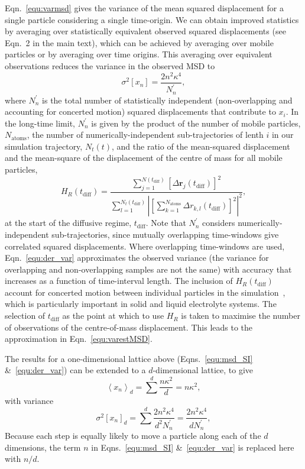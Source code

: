 \documentclass[reprint,superscriptaddress,nobibnotes,amsmath,amssymb,aps,prx,hidelinks,linenumbers]{revtex4-2}
\newcommand{\oMSDi}{\ensuremath{x_i}}
\newcommand{\oMSDn}{\ensuremath{x_n}}
\newcommand{\moMSDn}{\ensuremath{\left<\oMSDn\right>}}
\newcommand{\nind}[1]{\ensuremath{N^\prime_{#1}}}
\newcommand{\var}[1]{\ensuremath{\sigma^2[#1]}}
\begin{document}
Eqn.~\ref{equ:varmsd} gives the variance of the mean squared displacement for a single particle considering a single time-origin.
We can obtain improved statistics by averaging over statistically equivalent observed squared displacements (see Eqn.~2 in the main text), which can be achieved by averaging over mobile particles or by averaging over time origins.
This averaging over equivalent observations reduces the variance in the observed MSD to
\begin{equation}
    \var{\oMSDn} = \frac{2n^2\kappa^4}{\nind{n}},
\label{equ:der_var}
\end{equation}
where $\nind{n}$ is the total number of statistically independent (non-overlapping and accounting for concerted motion) squared displacements that contribute to $\oMSDi$.
In the long-time limit, $\nind{n}$ is given by the product of the number of mobile particles, $N_{\textrm{atoms}}$, the number of numerically-independent sub-trajectories of lenth $i$ in our simulation trajectory, $N_t(t)$, and the ratio of the mean-squared displacement and the mean-square of the displacement of the centre of mass for all mobile particles,
\begin{equation}
    H_R(t_{\textrm{diff}}) = \frac{\sum^{N(t_{\textrm{diff}})}_{j=1}{\left[\Delta\mathbf{r}_j(t_{\textrm{diff}})\right]}^2}{\sum^{N_{t}(t_{\textrm{diff}})}_{l=1}\left|\left[\sum^{N_{\textrm{atoms}}}_{k=1}\Delta r_{k,l}(t_{\textrm{diff}})\right]^2\right|^2},
\end{equation}
at the start of the diffusive regime, $t_{\textrm{diff}}$.
Note that $\nind{n}$ considers numerically-independent sub-trajectories, since mutually overlapping time-windows give correlated squared displacements.
Where overlapping time-windows are used, Eqn.~\ref{equ:der_var} approximates the observed variance (the variance for overlapping and non-overlapping samples are not the same) with accuracy that increases as a function of time-interval length. 
The inclusion of $H_R(t_{\textrm{diff}})$ account for concerted motion between individual particles in the simulation~\cite{vargas_dynamic_2019,canepa_pushing_2022}, which is particularly important in solid and liquid electrolyte systems. 
The selection of $t_{\textrm{diff}}$ as the point at which to use $H_R$ is taken to maximise the number of observations of the centre-of-mass displacement. 
This leads to the approximation in Eqn.~\ref{equ:varestMSD}.

The results for a one-dimensional lattice above (Eqns.~\ref{equ:msd_SI} \&~\ref{equ:der_var}) can be extended to a $d$-dimensional lattice, to give
\begin{equation}
    \moMSDn_{d} = \sum^d{\frac{n\kappa^2}{d}} = n\kappa^2,
\end{equation}
with variance
\begin{equation}
    \var{\oMSDn}_d = \sum^d{\frac{2n^2\kappa^4}{d^2\nind{n}}} = \frac{2n^2\kappa^4}{d\nind{n}},
\end{equation}
Because each step is equally likely to move a particle along each of the $d$ dimensions, the term $n$ in Eqns.~\ref{equ:msd_SI} \&~\ref{equ:der_var} is replaced here with $n/d$.
\end{document}
